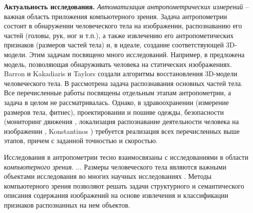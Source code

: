 
\textbf{Актуальность исследования.}
\emph{Автоматизация антропометрических измерений}  -- важная область приложения компьютерного зрения.  Задача антропометрии состоит в обнаружении человеческого тела на изображении, распознаванию его частей (головы, рук, ног и т.п.), а также извлечению его антропометических признаков (размеров частей тела) и, в идеале, создание соответствующей 3D-модели.  Этим задачам посвящено много исследований. Например, в \cite{YuChen2011, Albio2001} предложена модель, позволяющая обнаруживать человека на статических изображениях.  Barron и Kakadiaris \cite{Barron2000} и Taylors \cite{Taylor2000} создали алгоритмы восстановления 3D-модели человеческого тела.  В \cite{Micilotta2005, Mikolajczyk2004, Robert2004, Ronfard2002} рассмотрена задача распознавания основных частей тела.  Все перечисленные работы посвящены отдельным этапам антропометрии, а задача в целом не рассматривалась.  Однако, в здравоохранении (измерение размеров тела, фитнес), проектировании и пошиве одежды, безопасности (мониторинг движения \cite{Liu2010, Wang2013, Yan2014}, локализация распознавание деятельности человека на изображении \cite{Pirsiavash2012, Gan2015, Jainy2015, Jordi2012}, Konstantinos \cite{Konstantinos2016}) требуется реализация всех перечисленных выше этапов, причем с заданной точностью и скоростью.  

Исследования в антропометрии тесно взаимосвязаны с исследованиями в области \emph{компьютерного зрения}.  ... Размеры человеческого тела являются важными объектами исследования во многих научных исследованиях \cite{Paul2011,Michaell2011,Wuhre2014}.  Методы компьютерного зрения позволяют решать задачи структурного и семантического описания содержания изображений на основе извлечения и классификации признаков распознанных на нем объектов.

